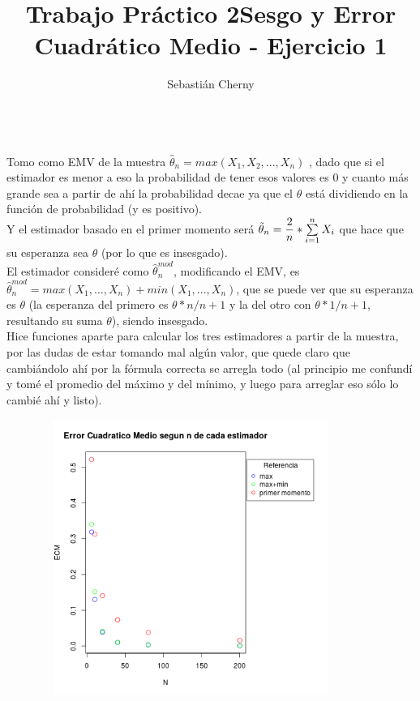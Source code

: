 \documentclass[a4paper]{article}
\title{Trabajo Práctico 2}
\author{Sebastián Cherny}
\begin{document}
\maketitle
\title{Sesgo y Error Cuadrático Medio - Ejercicio 1}
\\

Tomo como EMV de la muestra $\widehat{\theta}_n = max(X_1, X_2, ..., X_n)$ , dado que si el estimador es menor a eso la probabilidad de tener esos valores es $0$ y cuanto más grande sea a partir de ahí la probabilidad decae ya que el $\theta$ está dividiendo en la función de probabilidad (y es positivo).\\
Y el estimador basado en el primer momento será $\Tilde{\theta}_n = \dfrac{2}{n}*\sum\limits_{i=1}^n X_i$ que hace que su esperanza sea $\theta$ (por lo que es insesgado).\\
El estimador consideré como $\widehat{\theta}_n^{mod}$, modificando el EMV, es $\widehat{\theta}_n^{mod} = max(X_1, ..., X_n) + min(X_1, ..., X_n)$, que se puede ver que su esperanza es $\theta$ (la esperanza del primero es $\theta * n/n+1$ y la del otro con $\theta * 1/n+1$, resultando su suma $\theta$), siendo insesgado.\\

Hice funciones aparte para calcular los tres estimadores a partir de la muestra, por las dudas de estar tomando mal algún valor, que quede claro que cambiándolo ahí por la fórmula correcta se arregla todo (al principio me confundí y tomé el promedio del máximo y del mínimo, y luego para arreglar eso sólo lo cambié ahí y listo).

\includegraphics[width=12cm,height=9cm,keepaspectratio]{ejd.png}
\end{document}

